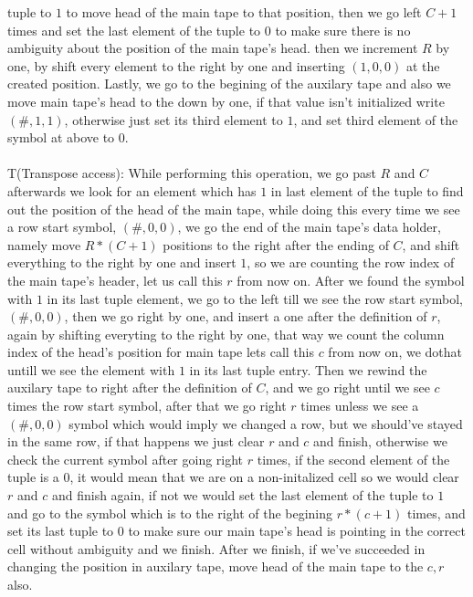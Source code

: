 \documentclass[12pt]{article}
\begin{document}
tuple to $1$ to move head of the main tape to that position, then we go left $C+1$ times and set the
last element of the tuple to $0$ to make sure there is no ambiguity about the position of the
main tape's head. then we increment $R$ by one, by shift every element to the right by one
and inserting $(1,0,0)$ at the created position. Lastly, we go to the begining of the auxilary tape
and also we move main tape's head to the down by one, if that value isn't initialized write $(\#,1,1)$, otherwise
just set its third element to $1$, and set third element of the symbol at above to $0$.\\
\\
T(Transpose access): While performing this operation, we go past $R$ and $C$ afterwards we look
for an element which has $1$ in last element of the tuple to find out the position of the head of the main
tape, while doing this every time we see a row start symbol, $(\#,0,0)$, we go the end of the main tape's
data holder, namely move $R*(C+1)$ positions to the right after the ending of $C$, and shift everything to
the right by one and insert $1$, so we are counting the row index of the main tape's header, let us call this $r$
from now on. After we found the symbol with $1$ in its last tuple element, we go to the left till we see
the row start symbol, $(\#,0,0)$, then we go right by one, and insert a one after the definition of $r$, again
by shifting everyting to the right by one, that way we count the column index of the head's position for main tape
lets call this $c$ from now on, we dothat untill we see the element with $1$ in its last tuple entry.
Then we rewind the auxilary tape to right after the definition of $C$, and we go right until we see $c$
times the row start symbol, after that we go right $r$ times unless we see a $(\#,0,0)$ symbol
which would imply we changed a row, but we should've stayed in the same row, if that happens we just clear
$r$ and $c$ and finish, otherwise we check the current symbol after going right $r$ times, if the second
element of the tuple is a $0$, it would mean that we are on a non-initalized cell so we would
clear $r$ and $c$ and finish again, if not we would set the last element of the tuple to $1$
and go to the symbol which is to the right of the begining $r*(c+1)$ times, and set its last tuple
to $0$ to make sure our main tape's head is pointing in the correct cell without ambiguity and we finish.
After we finish, if we've succeeded in changing the position in auxilary tape, move head of the main tape
to the $c,r$ also.
\\
\end{document}
